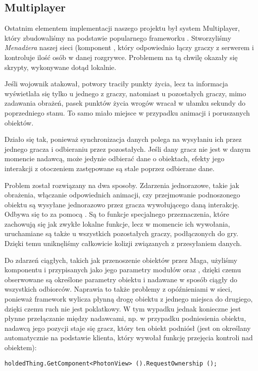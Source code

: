 \subsection{Multiplayer}
Ostatnim elementem implementacji naszego projektu był system Multiplayer, który zbudowaliśmy na podstawie popularnego frameworku . Stworzyliśmy \textit{Menadżera} naszej sieci (komponent , który odpowiednio łączy graczy z serwerem i kontroluje ilość osób w danej rozgrywce. Problemem na tą chwilę okazały się skrypty, wykonywane dotąd lokalnie.

Jeśli wojownik atakował, potwory traciły punkty życia, lecz ta informacja wyświetlała się tylko u jednego z graczy, natomiast u pozostałych graczy, mimo zadawania obrażeń, pasek punktów życia wrogów wracał w ułamku sekundy do poprzedniego stanu. To samo miało miejsce w przypadku animacji i poruszanych obiektów.

Działo się tak, ponieważ synchronizacja danych polega na wysyłaniu ich przez jednego gracza i odbieraniu przez pozostałych. Jeśli dany gracz nie jest w danym momencie nadawcą, może jedynie odbierać dane o obiektach, efekty jego interakcji z otoczeniem zastępowane są stale poprzez odbierane dane.

Problem został rozwiązany na dwa sposoby. Zdarzenia jednorazowe, takie jak obrażenia, włączanie odpowiednich animacji, czy przejmowanie podnoszonego obiektu są wysyłane jednorazowo przez gracza wywołującego daną interakcję. Odbywa się to za pomocą . Są to funkcje specjalnego przeznaczenia, które zachowują się jak zwykłe lokalne funkcje, lecz w momencie ich wywołania, uruchamiane są także u wszystkich pozostałych graczy, podłączonych do gry. Dzięki temu uniknęliśmy całkowicie kolizji związanych z przesyłaniem danych.

Do zdarzeń ciągłych, takich jak przenoszenie obiektów przez Maga, użyliśmy komponentu  i przypisanych jako jego parametry modułów  oraz , dzięki czemu obserwowane są określone parametry obiektu i nadawane w sposób ciągły do wszystkich odbiorców. Naprawia to także problemy z opóźnieniami w sieci, ponieważ framework wylicza płynną drogę obiektu z jednego miejsca do drugiego, dzięki czemu ruch nie jest poklatkowy. W tym wypadku jednak konieczne jest płynne przełączanie między nadawcami, np. w przypadku podniesienia obiektu, nadawcą jego pozycji staje się gracz, który ten obiekt podniósł (jest on określany automatycznie na podstawie klienta, który wywołał funkcję przejęcia kontroli nad obiektem):
\\
\begin{lstlisting}[caption={Funkcja przejmowania funkcji nadawania danych}]
holdedThing.GetComponent<PhotonView> ().RequestOwnership ();
\end{lstlisting}

